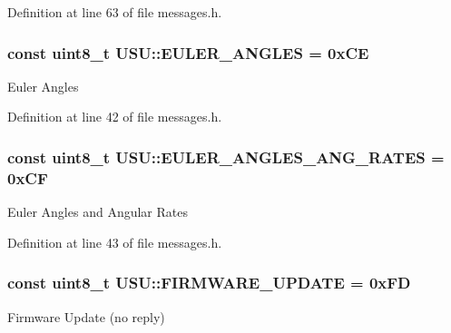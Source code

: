 \-Definition at line 63 of file messages.\-h.

\hypertarget{namespace_u_s_u_a6d35ce7963dec25cc43e551dccd71453}{
\subsubsection[{\-E\-U\-L\-E\-R\-\_\-\-A\-N\-G\-L\-E\-S}]{\setlength{\rightskip}{0pt plus 5cm}const uint8\-\_\-t {\bf \-U\-S\-U\-::\-E\-U\-L\-E\-R\-\_\-\-A\-N\-G\-L\-E\-S} = 0x\-C\-E}}\label{namespace_u_s_u_a6d35ce7963dec25cc43e551dccd71453}
\-Euler \-Angles 

\-Definition at line 42 of file messages.\-h.

\hypertarget{namespace_u_s_u_af604e3d925c2fe95f8a6b1af3f79d2d0}{
\subsubsection[{\-E\-U\-L\-E\-R\-\_\-\-A\-N\-G\-L\-E\-S\-\_\-\-A\-N\-G\-\_\-\-R\-A\-T\-E\-S}]{\setlength{\rightskip}{0pt plus 5cm}const uint8\-\_\-t {\bf \-U\-S\-U\-::\-E\-U\-L\-E\-R\-\_\-\-A\-N\-G\-L\-E\-S\-\_\-\-A\-N\-G\-\_\-\-R\-A\-T\-E\-S} = 0x\-C\-F}}\label{namespace_u_s_u_af604e3d925c2fe95f8a6b1af3f79d2d0}
\-Euler \-Angles and \-Angular \-Rates 

\-Definition at line 43 of file messages.\-h.

\hypertarget{namespace_u_s_u_a321d286cf60a5fd674ad8c0286db8748}{
\subsubsection[{\-F\-I\-R\-M\-W\-A\-R\-E\-\_\-\-U\-P\-D\-A\-T\-E}]{\setlength{\rightskip}{0pt plus 5cm}const uint8\-\_\-t {\bf \-U\-S\-U\-::\-F\-I\-R\-M\-W\-A\-R\-E\-\_\-\-U\-P\-D\-A\-T\-E} = 0x\-F\-D}}\label{namespace_u_s_u_a321d286cf60a5fd674ad8c0286db8748}
\-Firmware \-Update (no reply) 

